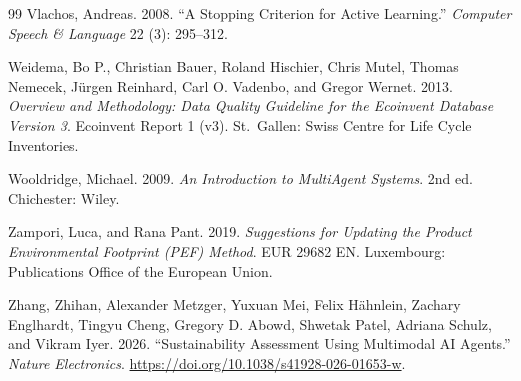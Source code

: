 \begin{thebibliography}{99}
Vlachos, Andreas. 2008. ``A Stopping Criterion for Active Learning.'' \emph{Computer Speech \& Language} 22 (3): 295--312.

Weidema, Bo P., Christian Bauer, Roland Hischier, Chris Mutel, Thomas Nemecek, J\"urgen Reinhard, Carl O. Vadenbo, and Gregor Wernet. 2013. \emph{Overview and Methodology: Data Quality Guideline for the Ecoinvent Database Version 3}. Ecoinvent Report 1 (v3). St.\ Gallen: Swiss Centre for Life Cycle Inventories.

Wooldridge, Michael. 2009. \emph{An Introduction to MultiAgent Systems}. 2nd ed. Chichester: Wiley.

Zampori, Luca, and Rana Pant. 2019. \emph{Suggestions for Updating the Product Environmental Footprint (PEF) Method}. EUR 29682 EN. Luxembourg: Publications Office of the European Union.

Zhang, Zhihan, Alexander Metzger, Yuxuan Mei, Felix H\"ahnlein, Zachary Englhardt, Tingyu Cheng, Gregory D. Abowd, Shwetak Patel, Adriana Schulz, and Vikram Iyer. 2026. ``Sustainability Assessment Using Multimodal AI Agents.'' \emph{Nature Electronics}. \url{https://doi.org/10.1038/s41928-026-01653-w}.

\end{thebibliography}

